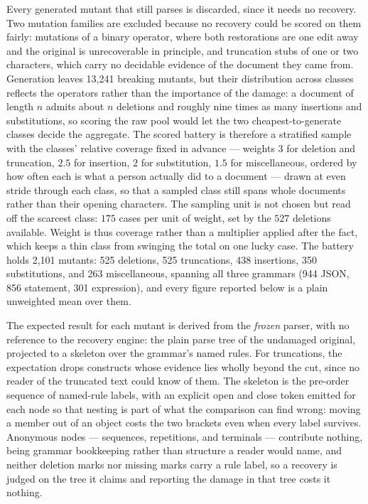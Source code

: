 \documentclass[manuscript]{acmart}
\begin{document}
Every generated mutant that still parses is discarded, since it needs no recovery. Two mutation families are excluded because no recovery could be scored on them fairly: mutations of a binary operator, where both restorations are one edit away and the original is unrecoverable in principle, and truncation stubs of one or two characters, which carry no decidable evidence of the document they came from. Generation leaves 13{,}241 breaking mutants, but their distribution across classes reflects the operators rather than the importance of the damage: a document of length $n$ admits about $n$ deletions and roughly nine times as many insertions and substitutions, so scoring the raw pool would let the two cheapest-to-generate classes decide the aggregate. The scored battery is therefore a stratified sample with the classes' relative coverage fixed in advance --- weights $3$ for deletion and truncation, $2.5$ for insertion, $2$ for substitution, $1.5$ for miscellaneous, ordered by how often each is what a person actually did to a document --- drawn at even stride through each class, so that a sampled class still spans whole documents rather than their opening characters. The sampling unit is not chosen but read off the scarcest class: $175$ cases per unit of weight, set by the $527$ deletions available. Weight is thus coverage rather than a multiplier applied after the fact, which keeps a thin class from swinging the total on one lucky case. The battery holds 2{,}101 mutants: 525 deletions, 525 truncations, 438 insertions, 350 substitutions, and 263 miscellaneous, spanning all three grammars (944 JSON, 856 statement, 301 expression), and every figure reported below is a plain unweighted mean over them.

The expected result for each mutant is derived from the \emph{frozen} parser, with no reference to the recovery engine: the plain parse tree of the undamaged original, projected to a skeleton over the grammar's named rules. For truncations, the expectation drops constructs whose evidence lies wholly beyond the cut, since no reader of the truncated text could know of them. The skeleton is the pre-order sequence of named-rule labels, with an explicit open and close token emitted for each node so that nesting is part of what the comparison can find wrong: moving a member out of an object costs the two brackets even when every label survives. Anonymous nodes --- sequences, repetitions, and terminals --- contribute nothing, being grammar bookkeeping rather than structure a reader would name, and neither deletion marks nor missing marks carry a rule label, so a recovery is judged on the tree it claims and reporting the damage in that tree costs it nothing.
\end{document}
